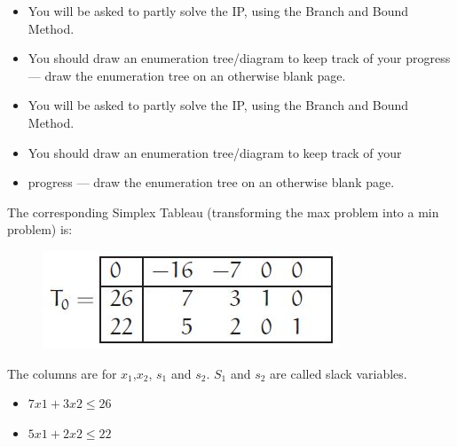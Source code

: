 \documentclass{beamer}
\begin{document}
\begin{frame}
\large
\begin{itemize}
\item You will be asked to partly solve the IP, using the Branch and Bound
Method. 
\item You should draw an enumeration tree/diagram to keep
track of your progress — draw the enumeration tree on an otherwise
blank page.
\end{itemize}
\end{frame}
\begin{frame}
\large
\begin{itemize}
\item You will be asked to partly solve the IP, using the Branch and Bound Method.
\item You should draw an enumeration tree/diagram to keep track of your
\item progress — draw the enumeration tree on an otherwise blank page.
\end{itemize}
\end{frame}
\begin{frame}
The corresponding Simplex Tableau (transforming the max problem into a
min problem) is:
\begin{figure}
\centering
\includegraphics[width=0.7\linewidth]{Exam14-a}
\end{figure}

\end{frame}

\begin{frame}

The columns are for $x_1$,$x_2$, $s_1$ and $s_2$. 
$S_1$ and $s_2$ are called slack variables.

\begin{itemize}
\item $7x1 + 3x2 \leq 26$  
\item $5x1 + 2x2 \leq 22$
\end{itemize}
\end{frame}
\end{document}
